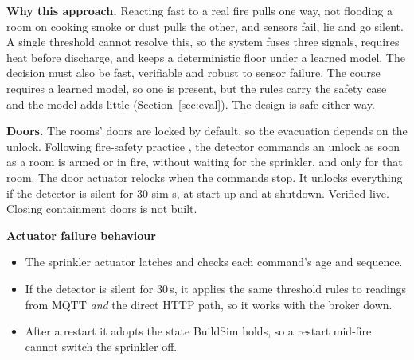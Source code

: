 \documentclass[11pt]{article}
\providecommand{\tightlist}{\setlength{\itemsep}{0pt}\setlength{\parskip}{0pt}}
\begin{document}
\textbf{Why this approach.} Reacting fast to a real fire pulls one way, not flooding a room on cooking smoke or dust pulls the other, and sensors fail, lie and go silent. A single threshold cannot resolve this, so the system fuses three signals, requires heat before discharge, and keeps a deterministic floor under a learned model. The decision must also be fast, verifiable and robust to sensor failure. The course requires a learned model, so one is present, but the rules carry the safety case and the model adds little (Section~\ref{sec:eval}). The design is safe either way.

\textbf{Doors.} The rooms' doors are locked by default, so the evacuation depends on the unlock. Following fire-safety practice \cite{nfpadoor,en14637,boverket}, the detector commands an unlock as soon as a room is armed or in fire, without waiting for the sprinkler, and only for that room. The door actuator relocks when the commands stop. It unlocks everything if the detector is silent for 30 sim s, at start-up and at shutdown. Verified live. Closing containment doors is not built.

\textbf{Actuator failure behaviour}
\begin{itemize}\tightlist
\item The sprinkler actuator latches and checks each command's age and sequence.
\item If the detector is silent for 30\,s, it applies the same threshold rules to readings from MQTT \emph{and} the direct HTTP path, so it works with the broker down.
\item After a restart it adopts the state BuildSim holds, so a restart mid-fire cannot switch the sprinkler off.
\end{itemize}
\end{document}
